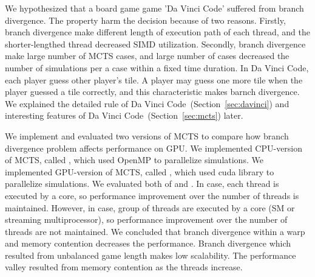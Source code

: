 We hypothesized that a board game game 'Da Vinci Code' suffered from branch divergence.
The property harm the decision because of two reasons.
Firstly, branch divergence make different length of execution path of each thread, and the shorter-lengthed thread decreased SIMD utilization.
Secondly, branch divergence make large number of MCTS cases, and large number of cases decreased the number of simulations per a case within a fixed time duration.
In Da Vinci Code, each player guess other player's tile.
A player may guess one more tile when the player guessed a tile correctly, and this characteristic makes barnch divergence.
We explained the detailed rule of Da Vinci Code~(Section~\ref{sec:davinci}) and interesting features of Da Vinci Code~(Section~\ref{sec:mcts}) later.


We implement and evaluated two versions of MCTS to compare how branch divergence problem affects performance on GPU.
We implemented CPU-version of MCTS, called \cpu, which used OpenMP to parallelize simulations.
We implemented GPU-version of MCTS, called \gpu, which used cuda library to parallelize simulations.
We evaluated both of \cpu and \gpu.
In \cpu case, each thread is executed by a core, so performance improvement over the number of threads is maintained.
However, in \gpu case, group of threads are executed by a core (SM or streaming multiprocessor), so performance improvement over the number of threads are not maintained.
We concluded that branch divergence within a warp and memory contention decreases the performance.
Branch divergence which resulted from unbalanced game length makes low scalability.
The performance valley resulted from memory contention as the threads increase. 


